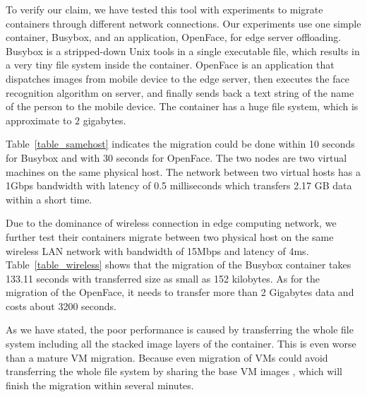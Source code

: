 To verify our claim, we have tested this tool with experiments to migrate containers through different network connections. Our experiments use one simple container, Busybox, and an application, OpenFace, for edge server offloading.  Busybox is a stripped-down Unix tools in a single executable file, which results in a very tiny file system inside the container. OpenFace\cite{openface2016} is an application that dispatches images from mobile device to the edge server, then executes the face recognition algorithm on server, and finally sends back a text string of the name of the person to the mobile device. The container has a huge file system, which is approximate to $2$ gigabytes.

Table~\ref{table_samehost} indicates the migration could be done within 10 seconds for Busybox and with 30 seconds for OpenFace. The two nodes are two virtual machines on the same physical host. The network between two virtual hosts has a 1Gbps bandwidth with latency of 0.5 milliseconds which transfers 2.17 GB data within a short time.

Due to the dominance of wireless connection in edge computing network, we further test their containers migrate  between two physical host on the same wireless LAN network with bandwidth of 15Mbps and latency of 4ms. Table~\ref{table_wireless} shows that the migration of the Busybox container takes 133.11 seconds with transferred size as small as 152 kilobytes. As for the migration of the OpenFace, it needs to transfer more than 2 Gigabytes data and  costs about 3200 seconds. 

As we have stated, the poor performance is caused by transferring  the whole file system including all the stacked image layers of the container. This is even worse than a mature VM migration. Because even migration of VMs could avoid transferring the whole file system by sharing the base VM images
    \cite{ha2015vmhandoff}, which will finish the migration within several minutes. 

